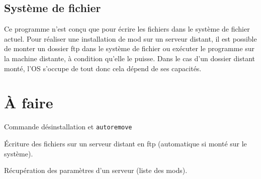 \documentclass{article}
\begin{document}
\subsection{Système de fichier}
Ce programme n'est conçu que pour écrire les fichiers dans le système de fichier actuel.
Pour réaliser une installation de mod sur un serveur distant, il est possible de monter un dossier ftp dans le système de fichier ou exécuter le programme sur la machine distante, à condition qu'elle le puisse.
Dans le cas d'un dossier distant monté, l'OS s'occupe de tout donc cela dépend de ses capacités.

\newpage
\section{À faire}
Commande désinstallation et \texttt{autoremove}

Écriture des fichiers sur un serveur distant en ftp (automatique si monté sur le système).

Récupération des paramètres d'un serveur (liste des mods).
	
\end{document}
